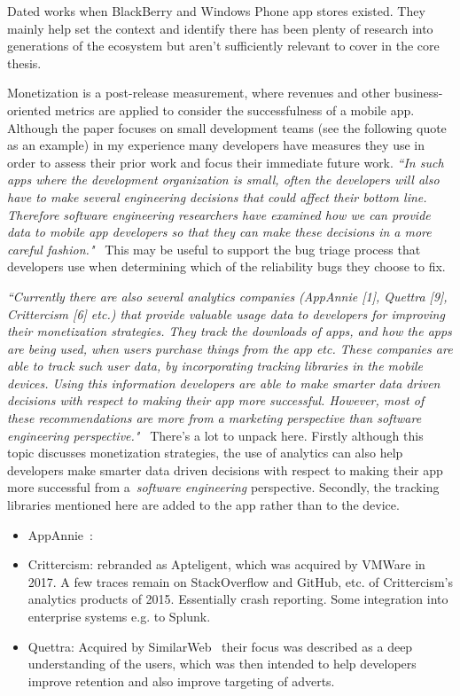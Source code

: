 Dated works when BlackBerry and Windows Phone app stores existed. They mainly help set the context and identify there has been plenty of research into generations of the ecosystem but aren't sufficiently relevant to cover in the core thesis.


Monetization is a post-release measurement, where revenues and other business-oriented metrics are applied to consider the successfulness of a mobile app. Although the paper focuses on small development teams (see the following quote as an example) in my experience many developers have measures they use in order to assess their prior work and focus their immediate future work. 
\emph{``In such apps where the development organization is small, often the developers will also have to make several engineering decisions that could affect their bottom line. Therefore software engineering researchers have examined how we can provide data to mobile app developers so that they can make these decisions in a more careful fashion."}~\citep[p. 28]{nagappan2016_future_trends_in_sw_eng_for_mobile_apps} This may be useful to support the bug triage process that developers use when determining which of the reliability bugs they choose to fix.

\emph{``Currently there are also several analytics companies (AppAnnie [1], Quettra [9], Crittercism [6] etc.) that provide valuable usage data to developers for improving their monetization strategies. They track the downloads of apps, and how the apps are being used, when users purchase things from the app etc. These companies are able to track such user data, by incorporating tracking libraries in the mobile devices. Using this information developers are able to make smarter data driven decisions with respect to making their app more successful. However, most of these recommendations are more from a marketing perspective than software engineering perspective."}~\citep[p. 28]{nagappan2016_future_trends_in_sw_eng_for_mobile_apps} 
There's a lot to unpack here. Firstly although this topic discusses monetization strategies, the use of analytics can also help developers make smarter data driven decisions with respect to making their app more successful from a~\emph{software engineering} perspective. Secondly, the tracking libraries mentioned here are added to the app rather than to the device. 
\begin{itemize}
    \item AppAnnie~\citep{appannie2021}: 
    \item Crittercism: rebranded as Apteligent, which was acquired by VMWare in 2017. A few traces remain on StackOverflow and GitHub, etc. of Crittercism's analytics products of 2015. Essentially crash reporting. Some integration into enterprise systems e.g. to Splunk.
    \item Quettra: Acquired by SimilarWeb~\citep{techcrunch2015_quettra_mobile_analytics_acquired} their focus was described as a deep understanding of the users, which was then intended to help developers improve retention and also improve targeting of adverts.
\end{itemize}



